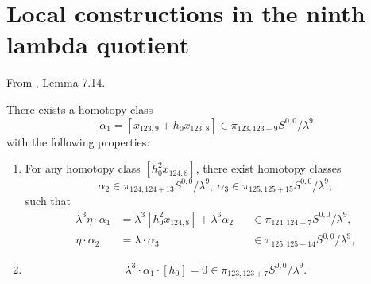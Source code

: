 \section{Local constructions in the ninth lambda quotient}

\begin{lemma}
\label{paper:7.14}
From \cite{LWX126}, Lemma 7.14.\par
\label{lem:x_123_9}\label{lem:x1239}
    There exists a homotopy class 
    $$\alpha_1 = [x_{123,9}+h_0x_{123,8}] \in \pi_{123,123+9} S^{0,0}/\lambda^9$$
    with the following properties:
    \begin{enumerate}
    \item For any homotopy class $[h_0^2 x_{124,8}]$, there exist homotopy classes 
    $$\alpha_2 \in \pi_{124,124+13} S^{0,0}/\lambda^9, \ \alpha_3 \in \pi_{125,125+15} S^{0,0}/\lambda^9,$$ 
    such that 
    \begin{align*}
        \lambda^3 \eta \cdot \alpha_1 & = \lambda^3 [h_0^2 x_{124,8}] + 
\lambda^6 \alpha_2 && \in \pi_{124,124+7} S^{0,0}/\lambda^9,\\
\eta \cdot \alpha_2 & = \lambda \cdot \alpha_3 && \in \pi_{125,125+14} S^{0,0}/\lambda^9,
    \end{align*}
\item \leavevmode\vspace*{-\dimexpr\abovedisplayskip + \baselineskip} 
$$\lambda^3 \cdot \alpha_1 \cdot [h_0] = 0 \in \pi_{123,123+7} S^{0,0}/\lambda^9.$$
    \end{enumerate}


\end{lemma}
